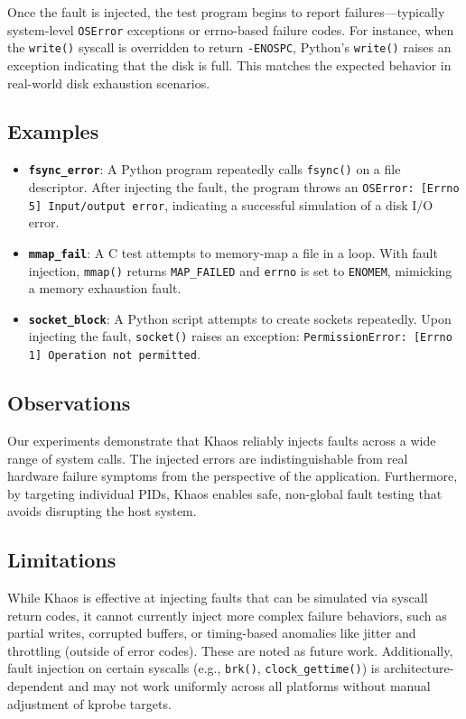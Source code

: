 Once the fault is injected, the test program begins to report failures—typically system-level \texttt{OSError} exceptions or errno-based failure codes. For instance, when the \texttt{write()} syscall is overridden to return \texttt{-ENOSPC}, Python’s \texttt{write()} raises an exception indicating that the disk is full. This matches the expected behavior in real-world disk exhaustion scenarios.

\subsection{Examples}

\begin{itemize}
    \item \textbf{\texttt{fsync\_error}}: A Python program repeatedly calls \texttt{fsync()} on a file descriptor. After injecting the fault, the program throws an \texttt{OSError: [Errno 5] Input/output error}, indicating a successful simulation of a disk I/O error.
    
    \item \textbf{\texttt{mmap\_fail}}: A C test attempts to memory-map a file in a loop. With fault injection, \texttt{mmap()} returns \texttt{MAP\_FAILED} and \texttt{errno} is set to \texttt{ENOMEM}, mimicking a memory exhaustion fault.
    
    \item \textbf{\texttt{socket\_block}}: A Python script attempts to create sockets repeatedly. Upon injecting the fault, \texttt{socket()} raises an exception: \texttt{PermissionError: [Errno 1] Operation not permitted}.
\end{itemize}

\subsection{Observations}

Our experiments demonstrate that Khaos reliably injects faults across a wide range of system calls. The injected errors are indistinguishable from real hardware failure symptoms from the perspective of the application. Furthermore, by targeting individual PIDs, Khaos enables safe, non-global fault testing that avoids disrupting the host system.

\subsection{Limitations}

While Khaos is effective at injecting faults that can be simulated via syscall return codes, it cannot currently inject more complex failure behaviors, such as partial writes, corrupted buffers, or timing-based anomalies like jitter and throttling (outside of error codes). These are noted as future work. Additionally, fault injection on certain syscalls (e.g., \texttt{brk()}, \texttt{clock\_gettime()}) is architecture-dependent and may not work uniformly across all platforms without manual adjustment of kprobe targets.

